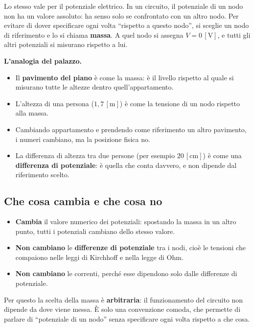 Lo stesso vale per il potenziale elettrico. In un circuito, il potenziale di un nodo non ha un valore assoluto: ha senso solo se confrontato con un altro nodo. Per evitare di dover specificare ogni volta ``rispetto a questo nodo'', si sceglie un nodo di riferimento e lo si chiama \textbf{massa}. A quel nodo si assegna \(V = 0\,[\text{V}]\), e tutti gli altri potenziali si misurano rispetto a lui.

\begin{esempio}
\textbf{L'analogia del palazzo.}
\begin{itemize}[leftmargin=1cm]
  \item Il \textbf{pavimento del piano} è come la massa: è il livello rispetto al quale si misurano tutte le altezze dentro quell'appartamento.
  \item L'altezza di una persona (\(1{,}7\,[\text{m}]\)) è come la tensione di un nodo rispetto alla massa.
  \item Cambiando appartamento e prendendo come riferimento un altro pavimento, i numeri cambiano, ma la posizione fisica no.
  \item La differenza di altezza tra due persone (per esempio \(20\,[\text{cm}]\)) è come una \textbf{differenza di potenziale}: è quella che conta davvero, e non dipende dal riferimento scelto.
\end{itemize}
\end{esempio}

\subsection{Che cosa cambia e che cosa no}

\begin{itemize}[leftmargin=1cm]
  \item \textbf{Cambia} il valore numerico dei potenziali: spostando la massa in un altro punto, tutti i potenziali cambiano dello stesso valore.
  \item \textbf{Non cambiano} le \textbf{differenze di potenziale} tra i nodi, cioè le tensioni che compaiono nelle leggi di Kirchhoff e nella legge di Ohm.
  \item \textbf{Non cambiano} le correnti, perché esse dipendono solo dalle differenze di potenziale.
\end{itemize}

Per questo la scelta della massa è \textbf{arbitraria}: il funzionamento del circuito non dipende da dove viene messa. È solo una convenzione comoda, che permette di parlare di ``potenziale di un nodo'' senza specificare ogni volta rispetto a che cosa.

